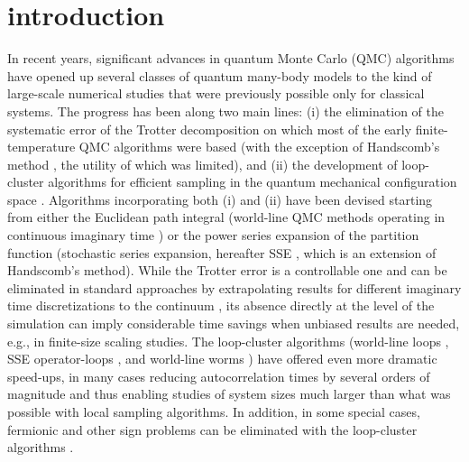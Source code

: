 \documentclass[10pt,pre,aps,twocolumn,showpacs,superscriptaddress,
floatfix]{revtex4}
\begin{document}

\section{introduction}
In recent years, significant advances in quantum Monte Carlo (QMC) algorithms 
have opened up several classes of quantum many-body models to the kind of
large-scale numerical studies that were previously possible only for classical
systems. The progress has been along two main lines: (i) the elimination 
\cite{sse1,sse2,prokofev,beard,rombouts} of the systematic error of the 
Trotter decomposition \cite{suzuki1} on which most of the early 
finite-temperature QMC algorithms 
\cite{suzuki2,barma,worldline,cullen,determinant} were based (with the
exception of Handscomb's method \cite{handscomb,lyklema,lee,chakravarty}, 
the utility of which was limited), and (ii) the development of loop-cluster 
algorithms \cite{evertz} for efficient sampling in the quantum mechanical 
configuration space \cite{prokofev,beard,kawashima,sse3,syljuasen}. 
Algorithms incorporating both (i) and (ii) have been devised starting from 
either the Euclidean path integral (world-line QMC methods operating in 
continuous imaginary time \cite{prokofev,beard}) or the power series expansion
of the partition function (stochastic series expansion, hereafter SSE 
\cite{sse3}, which is an extension of Handscomb's method). While the Trotter 
error is a controllable one and can be eliminated in standard approaches by 
extrapolating results for different imaginary time discretizations to the 
continuum \cite{suzuki1,fye}, its absence directly at the level of the 
simulation can imply considerable time savings when unbiased 
results are needed, e.g., in finite-size scaling studies. The
loop-cluster algorithms (world-line loops \cite{evertz,kawashima,syljuasen}, 
SSE operator-loops \cite{sse3}, and world-line worms \cite{prokofev}) have 
offered even more dramatic speed-ups, in many cases reducing autocorrelation 
times by several orders of magnitude and thus enabling studies of system sizes
much larger than what was possible with local sampling algorithms. 
In addition, in some special cases, fermionic and other sign problems can 
be eliminated with the loop-cluster algorithms 
\cite{chandrasekharan,cox,henelius}.
\end{document}
